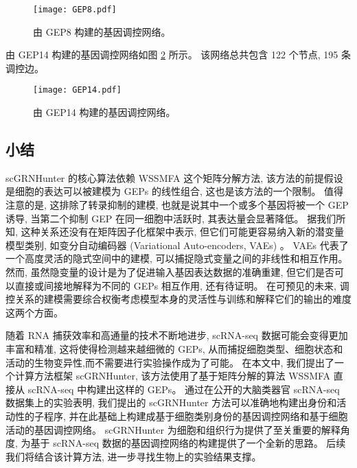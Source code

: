 \begin{figure}[!htbp]
    \centering
    \texttt{[image: GEP8.pdf]}
    \caption{由 GEP8 构建的基因调控网络。}
    \label{fig:gep-grn-gep8}
\end{figure}

由 GEP14 构建的基因调控网络如图 \ref{fig:gep-grn-gep14} 所示。
该网络总共包含 122 个节点, 195 条调控边。
\begin{figure}[!htbp]
    \centering
    \texttt{[image: GEP14.pdf]}
    \caption{由 GEP14 构建的基因调控网络。}
    \label{fig:gep-grn-gep14}
\end{figure}


\subsection{小结}
scGRNHunter 的核心算法依赖 WSSMFA 这个矩阵分解方法,
该方法的前提假设是细胞的表达可以被建模为 GEPs 的线性组合,
这也是该方法的一个限制。
值得注意的是, 这排除了转录抑制的建模, 也就是说其中一个或多个基因将被一个 GEP 诱导,
当第二个抑制 GEP 在同一细胞中活跃时, 其表达量会显著降低。
据我们所知, 这种关系还没有在矩阵因子化框架中表示, 但它们可能更容易纳入新的潜变量模型类别,
如变分自动编码器 (Variational Auto-encoders, VAEs) \cite{ding2018interpretable,gronbech2018scvae}。
VAEs 代表了一个高度灵活的隐式空间中的建模, 可以捕捉隐式变量之间的非线性和相互作用。
然而, 虽然隐变量的设计是为了促进输入基因表达数据的准确重建, 
但它们是否可以直接或间接地解释为不同的 GEPs 相互作用, 还有待证明。
在可预见的未来, 调控关系的建模需要综合权衡考虑模型本身的灵活性与训练和解释它们的输出的难度这两个方面。

随着 RNA 捕获效率和高通量的技术不断地进步, scRNA-seq 数据可能会变得更加丰富和精准,
这将使得检测越来越细微的 GEPs, 从而捕捉细胞类型、细胞状态和活动的生物变异性,而不需要进行实验操作成为了可能。
在本文中, 我们提出了一个计算方法框架 scGRNHunter,
该方法使用了基于矩阵分解的算法 WSSMFA 直接从 scRNA-seq 中构建出这样的 GEPs。 
通过在公开的大脑类器官 scRNA-seq 数据集上的实验表明,
我们提出的 scGRNHunter 方法可以准确地构建出身份和活动性的子程序, 
并在此基础上构建成基于细胞类别身份的基因调控网络和基于细胞活动的基因调控网络。
scGRNHunter 为细胞和组织行为提供了至关重要的解释角度,
为基于 scRNA-seq 数据的基因调控网络的构建提供了一个全新的思路。
后续我们将结合该计算方法, 进一步寻找生物上的实验结果支撑。
